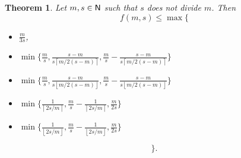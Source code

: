 \documentclass[12pt]{article}
\newcommand{\nat}{{\sf N}}
\newcommand{\ceil}[1]{\left\lceil {#1}\right\rceil}
\newcommand{\floor}[1]{\left\lfloor{#1}\right\rfloor}
\newtheorem{theoremfoo}{Theorem}[section] %
\newenvironment{theorem}{\pagebreak[1]\begin{theoremfoo}}{\end{theoremfoo}}
\begin{document}
\vfill\eject

\begin{theorem}\label{th:lbcases}
Let $m,s\in\nat$ such that $s$ does not divide $m$.
Then
$$f(m,s) \le \max \biggl \{$$
\begin{itemize}
\item
$\frac{m}{3s}$,  
\item
$\min \{ \frac{m}{s}, \frac{s-m}{s\ceil{m/2(s-m)}}, \frac{m}{s}-\frac{s-m}{s\ceil{m/2(s-m)}} \}$
\item
$\min \{ \frac{m}{s}, \frac{s-m}{s\floor{m/2(s-m)}}, \frac{m}{s}-\frac{s-m}{s\floor{m/2(s-m)}} \}$
\item
$\min \biggl \{ \frac{1}{\ceil{2s/m}}, \frac{m}{s}-\frac{1}{\ceil{2s/m}},\frac{m}{2s} \biggr \}$
\item
$\min \biggl \{ \frac{1}{\floor{2s/m}}, \frac{m}{s}-\frac{1}{\floor{2s/m}},\frac{m}{2s} \biggr \}$
\end{itemize}
$$\biggr \}. $$
\end{theorem}
\end{document}
